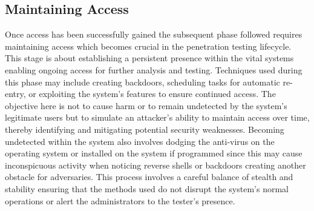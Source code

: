 \documentclass[manuscript,acmsmall,anonymous,review,screen,nonacm=true, authorversion=true]{acmart}
\begin{document}
\subsection{ Maintaining Access}
Once access has been successfully gained the subsequent phase followed requires
maintaining access which becomes crucial in the penetration testing lifecycle. This stage is about establishing a persistent presence within the vital systems enabling ongoing
access for further analysis and testing. Techniques used during this phase may
include creating backdoors, scheduling tasks for automatic re-entry, or exploiting the system's
features to ensure continued access. The objective here is not to cause harm or to
remain undetected by the system's legitimate users but to simulate an attacker's ability to
maintain access over time, thereby identifying and mitigating potential security weaknesses. Becoming undetected within the system also involves dodging the anti-virus on the
operating system or installed on the system if programmed since this may cause inconspicuous
activity when noticing reverse shells or backdoors creating another obstacle for adversaries. This process involves a careful balance of stealth and stability ensuring that the
methods used do not disrupt the system's normal operations or alert the administrators to the
tester's presence.
\end{document}
